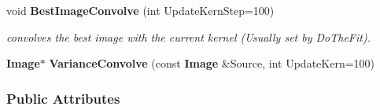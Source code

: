 \begin{CompactItemize}
\item 
void {\bf Best\-Image\-Convolve} (int Update\-Kern\-Step=100)
\begin{CompactList}\small\item\em convolves the best image with the current kernel (Usually set by Do\-The\-Fit).\item\end{CompactList}\item 
{}
{\bf Image}$\ast$ {\bf Variance\-Convolve} (const {\bf Image} \&Source, int Update\-Kern=100)\label{class_kernelfit_a22}

\end{CompactItemize}
\subsubsection*{Public Attributes}
